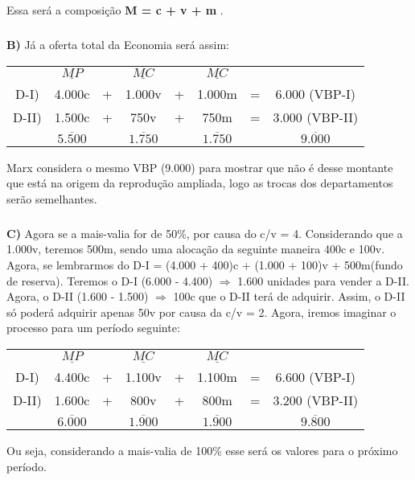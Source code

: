 \documentclass[a4paper, 12pt]{article} %
\begin{document}
Essa será a composição \textbf{M = c + v + m }.

\subparagraph{} \textbf{B)} Já a oferta total da Economia será assim: 

\begin{center}
	\begin{tabular}{cccccccc}
		
		& $\underline{MP}$ & & $\underline{MC}$ & & $\underline{MC}$ \\
		D-I) & 4.000c & + & 1.000v & + & 1.000m &=& 6.000 (VBP-I) \\
		D-II) & 1.500c & + & 750v & + & 750m &=& 3.000 (VBP-II) \\
		&  $\overline{5.500}$ & & $\overline{1.750}$ & & $\overline{1.750}$ & & $\overline{9.000}$
		
	\end{tabular}
\end{center}

Marx considera o mesmo VBP (9.000) para mostrar que não é desse montante que está na origem da reprodução ampliada, logo as trocas dos departamentos serão semelhantes.

\subparagraph{} \textbf{C)} Agora se a mais-valia for de 50\%, por causa do c/v = 4. Considerando que a 1.000v, teremos 500m, sendo uma alocação da seguinte maneira 400c e 100v. Agora, se lembrarmos do D-I = (4.000 + 400)c + (1.000 + 100)v + 500m(fundo de reserva). Teremos o D-I (6.000 - 4.400) $\Rightarrow$ 1.600 unidades para vender a D-II. Agora, o D-II (1.600 - 1.500) $\Rightarrow$ 100c que o D-II terá de adquirir. Assim, o D-II só poderá adquirir apenas 50v por causa da c/v = 2. Agora, iremos imaginar o processo para um período seguinte:

\begin{center}
	\begin{tabular}{cccccccc}
		
		& $\underline{MP}$ & & $\underline{MC}$ & & $\underline{MC}$ \\
		D-I) & 4.400c & + & 1.100v & + & 1.100m &=& 6.600 (VBP-I) \\
		D-II) & 1.600c & + & 800v & + & 800m &=& 3.200 (VBP-II) \\
		&  $\overline{6.000}$ & & $\overline{1.900}$ & & $\overline{1.900}$ & & $\overline{9.800}$
		
	\end{tabular}
\end{center}
Ou seja, considerando a mais-valia de 100\% esse será os valores para o próximo período.
\end{document}
